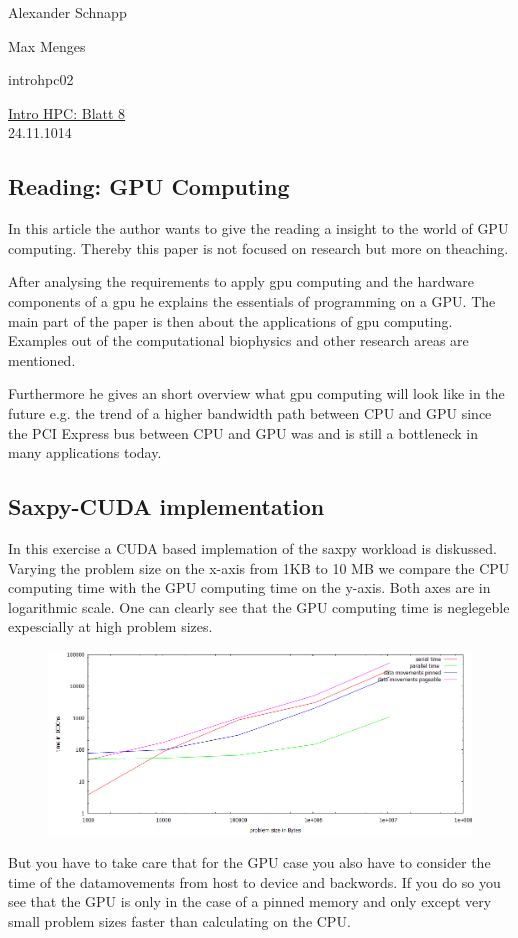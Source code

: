 \documentclass[a4paper,11pt]{scrartcl}
\begin{document}
\hfill Alexander Schnapp

\hfill Max Menges

\hfill introhpc02

\begin{center}
\underline{\Huge{Intro HPC: Blatt 8}}\\
\large{24.11.1014}\\
\end{center}


\subsection{Reading: GPU Computing}
In this article the author wants to give the reading a insight to the world of GPU computing. Thereby this paper is not focused on research but more on theaching.

After analysing the requirements to apply gpu computing and the hardware components of a gpu he explains
the essentials of programming on a GPU.
The main part of the paper is then about the applications of gpu computing. Examples out of the computational biophysics and other research areas are mentioned.


Furthermore he gives an short overview what gpu computing will look like in the future e.g. the trend of a higher bandwidth
path between CPU and GPU since the PCI Express bus
between CPU and GPU was and is still a bottleneck in many
applications today.

\subsection{Saxpy-CUDA implementation}
In this exercise a CUDA based implemation of the saxpy workload is diskussed. Varying the problem size on the x-axis from 1KB to 10 MB
we compare the CPU computing time with the GPU computing time on the y-axis. Both axes are in logarithmic scale. One can clearly see that the GPU computing time is neglegeble expescially at high problem sizes.

\begin{figure}[htbp]
\includegraphics[width=\linewidth,
keepaspectratio]{vergleich}
\centering
\end{figure}

But you have to take care that for the GPU case you also have to consider the time of the datamovements from host to device and backwords. If you do so you see that the GPU is only in the case of a pinned memory and only except very small problem sizes faster than calculating on the CPU. 
\end{document}
